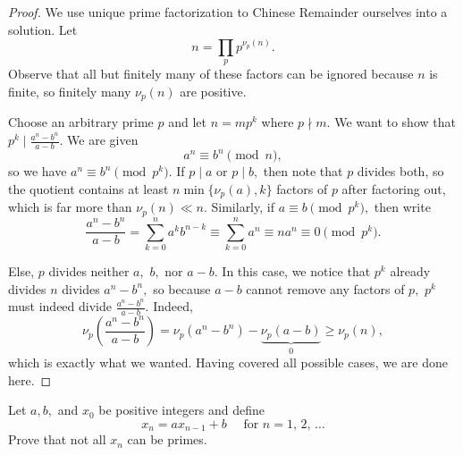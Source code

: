 \begin{proof}
We use unique prime factorization to Chinese Remainder ourselves into a solution. Let
\[n=\prod_pp^{\nu_p(n)}.\]
Observe that all but finitely many of these factors can be ignored because $n$ is finite, so finitely many $\nu_p(n)$ are positive.

Choose an arbitrary prime $p$ and let $n=mp^k$ where $p\nmid m.$ We want to show that $p^k\mid\frac{a^n-b^n}{a-b}.$ We are given
\[a^n\equiv b^n\pmod n,\]
so we have $a^n\equiv b^n\pmod{p^k}.$ If $p\mid a$ or $p\mid b,$ then note that $p$ divides both, so the quotient contains at least $n\min\{\nu_p(a),k\}$ factors of $p$ after factoring out, which is far more than $\nu_p(n)\ll n.$ Similarly, if $a\equiv b\pmod{p^k},$ then write
\[\frac{a^n-b^n}{a-b}=\sum_{k=0}^na^kb^{n-k}\equiv\sum_{k=0}^na^n\equiv na^n\equiv0\pmod{p^k}.\]

Else, $p$ divides neither $a,$ $b,$ nor $a-b.$ In this case, we notice that $p^k$ already divides $n$ divides $a^n-b^n,$ so because $a-b$ cannot remove any factors of $p,$ $p^k$ must indeed divide $\frac{a^n-b^n}{a-b}.$ Indeed,
\[\nu_p\left(\frac{a^n-b^n}{a-b}\right)=\nu_p\left(a^n-b^n\right)-\underbrace{\nu_p(a-b)}_0\ge\nu_p(n),\]
which is exactly what we wanted. Having covered all possible cases, we are done here.
\end{proof}

\begin{exercise}
Let $a,b,$ and $x_0$ be positive integers and define
\[x_n=ax_{n-1}+b\quad\text{ for }n=1,\,2,\,\ldots\]
Prove that not all $x_n$ can be primes.
\end{exercise}

